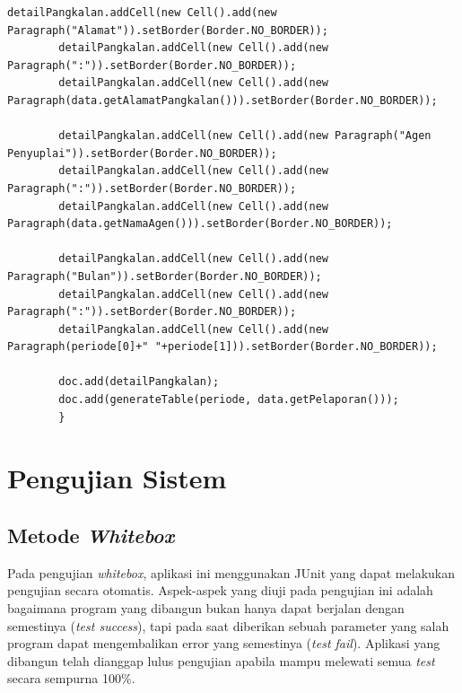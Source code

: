 \begin{enumerate}[a.]
\begin{lstlisting}[caption=Potongan kode ekspor data aplikasi berbasis web, label=eksporWeb]
		detailPangkalan.addCell(new Cell().add(new Paragraph("Alamat")).setBorder(Border.NO_BORDER));
		detailPangkalan.addCell(new Cell().add(new Paragraph(":")).setBorder(Border.NO_BORDER));
		detailPangkalan.addCell(new Cell().add(new Paragraph(data.getAlamatPangkalan())).setBorder(Border.NO_BORDER));
		
		detailPangkalan.addCell(new Cell().add(new Paragraph("Agen Penyuplai")).setBorder(Border.NO_BORDER));
		detailPangkalan.addCell(new Cell().add(new Paragraph(":")).setBorder(Border.NO_BORDER));
		detailPangkalan.addCell(new Cell().add(new Paragraph(data.getNamaAgen())).setBorder(Border.NO_BORDER));
		
		detailPangkalan.addCell(new Cell().add(new Paragraph("Bulan")).setBorder(Border.NO_BORDER));
		detailPangkalan.addCell(new Cell().add(new Paragraph(":")).setBorder(Border.NO_BORDER));
		detailPangkalan.addCell(new Cell().add(new Paragraph(periode[0]+" "+periode[1])).setBorder(Border.NO_BORDER));
		
		doc.add(detailPangkalan);
		doc.add(generateTable(periode, data.getPelaporan()));
		}
		\end{lstlisting}

	\end{enumerate}

	
	\section{Pengujian Sistem}
	
		\subsection{Metode \textit{Whitebox}}
			\par Pada pengujian \textit{whitebox}, aplikasi ini menggunakan JUnit yang dapat melakukan pengujian secara otomatis. Aspek-aspek yang diuji pada pengujian ini adalah bagaimana program yang dibangun bukan hanya dapat berjalan dengan semestinya (\textit{test success}), tapi pada saat diberikan sebuah parameter yang salah program dapat mengembalikan error yang semestinya (\textit{test fail}). Aplikasi yang dibangun telah dianggap lulus pengujian apabila mampu melewati semua \textit{test} secara sempurna 100\%. 
			
			
